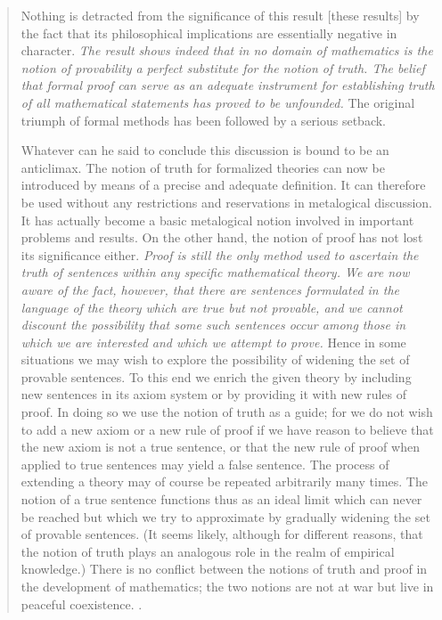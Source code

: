 \begin{quotation}
Nothing is detracted from the significance of this result [these
results] by the fact that its philosophical implications are
essentially negative in character. \emph{The result shows indeed that
in no domain of mathematics is the notion of provability a perfect
substitute for the notion of truth. The belief that formal proof can
serve as an adequate instrument for establishing truth of all
mathematical statements has proved to be unfounded.} The original
triumph of formal methods has been followed by a serious setback.

Whatever can he said to conclude this discussion is bound to be an
anticlimax. The notion of truth for formalized the­ories can now be
introduced by means of a precise and ad­equate definition. It can
therefore be used without any re­strictions and reservations in
metalogical discussion. It has actually become a basic metalogical
notion involved in im­portant problems and results. On the other hand,
the notion of proof has not lost its significance either. \emph{Proof
is still the only method used to ascertain the truth of sentences
within any specific mathematical theory. We are now aware of the fact,
however, that there are sentences formulated in the language of the
theory which are true but not provable, and we cannot discount the
possibility that some such sentences occur among those in which we are
interested and which we attempt to prove.} Hence in some situations we
may wish to explore the possibility of widening the set of provable
sen­tences. To this end we enrich the given theory by including new
sentences in its axiom system or by providing it with new rules of
proof. In doing so we use the notion of truth as a guide; for we do
not wish to add a new axiom or a new rule of proof if we have reason
to believe that the new axiom is not a true sentence, or that the new
rule of proof when applied to true sentences may yield a false
sentence. The process of extending a theory may of course be repeated
arbitrarily many times. The notion of a true sentence functions thus
as an ideal limit which can never be reached but which we try to
approximate by gradually widening the set of provable sentences. (It
seems likely, although for different reasons, that the notion of truth
plays an analogous role in the realm of empirical knowledge.) There is
no conflict between the notions of truth and proof in the development
of mathematics; the two notions are not at war but live in peaceful
coexistence. \citep[p.~77, emphasis added]{Tarski1969}.
\end{quotation}
